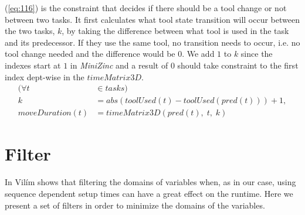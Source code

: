   \noindent (\ref{eq:116}) is the constraint that decides if there should be a tool change or not between two tasks. It first calculates what tool state transition will occur between the two tasks, $k$, by taking the difference between what tool is used in the task and its predecessor. If they use the same tool, no transition needs to occur, i.e. no tool change needed and the difference would be $0$. We add $1$ to $k$ since the indexes start at $1$ in \emph{MiniZinc} and a result of $0$ should take constraint to the first index dept-wise in the $timeMatrix3D$.
 \begin{equation}\label{eq:116}
 \begin{aligned}
 (\forall t &\in tasks) \\
 k &= abs(toolUsed(t) - toolUsed(pred(t))) + 1, \\
 moveDuration(t) &= timeMatrix3D(pred(t), \; t, \; k)
 \end{aligned}
 \end{equation}
 
 \newpage
 
 \section{Filter}
  In \cite{VilimBartak2002Batch} \cite{Vilim2002Precedence} \cite{VilimBartak2002Sequence} Vilím shows that filtering the domains of variables when, as in our case, using sequence dependent setup times can have a great effect on the runtime. Here we present a set of filters in order to minimize the domains of the variables.
  

